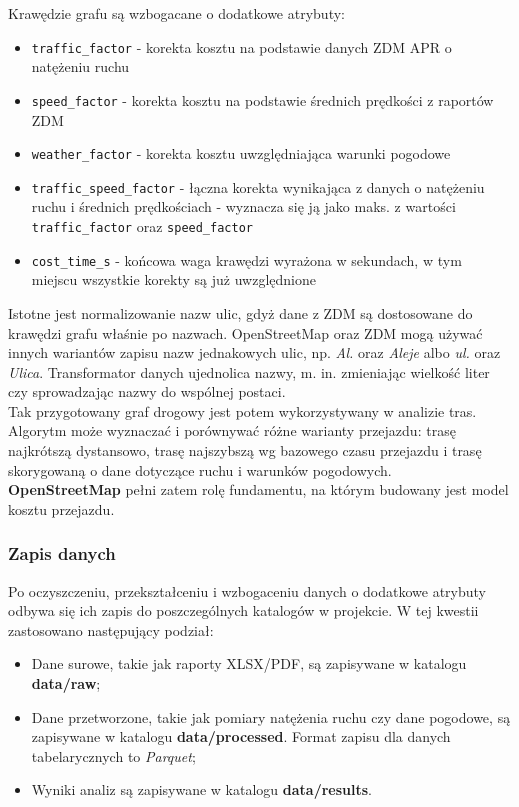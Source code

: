 \documentclass[12pt]{article}
\begin{document}
Krawędzie grafu są wzbogacane o dodatkowe atrybuty:
\begin{itemize}
\item \texttt{traffic\_factor} - korekta kosztu na podstawie danych ZDM APR o natężeniu ruchu
\item \texttt{speed\_factor} - korekta kosztu na podstawie średnich prędkości z raportów ZDM
\item \texttt{weather\_factor} - korekta kosztu uwzględniająca warunki pogodowe
\item \texttt{traffic\_speed\_factor} - łączna korekta wynikająca z danych o natężeniu ruchu i średnich prędkościach - wyznacza się ją jako maks. z wartości \texttt{traffic\_factor} oraz \texttt{speed\_factor}
\item \texttt{cost\_time\_s} - końcowa waga krawędzi wyrażona w sekundach, w tym miejscu wszystkie korekty są już uwzględnione
\end{itemize}

Istotne jest normalizowanie nazw ulic, gdyż dane z ZDM są dostosowane do krawędzi grafu właśnie po nazwach. OpenStreetMap oraz ZDM mogą używać innych wariantów zapisu nazw jednakowych ulic, np. \textit{Al.} oraz \textit{Aleje} albo \textit{ul.} oraz \textit{Ulica}. Transformator danych ujednolica nazwy, m. in. zmieniając wielkość liter czy sprowadzając nazwy do wspólnej postaci.\\

Tak przygotowany graf drogowy jest potem wykorzystywany w analizie tras. Algorytm może wyznaczać i porównywać różne warianty przejazdu: trasę najkrótszą dystansowo, trasę najszybszą wg bazowego czasu przejazdu i trasę skorygowaną o dane dotyczące ruchu i warunków pogodowych.\\

\textbf{OpenStreetMap} pełni zatem rolę fundamentu, na którym budowany jest model kosztu przejazdu.

\subsubsection{Zapis danych}

Po oczyszczeniu, przekształceniu i wzbogaceniu danych o dodatkowe atrybuty odbywa się ich zapis do poszczególnych katalogów w projekcie.
W tej kwestii zastosowano następujący podział:
\begin{itemize}
    \item Dane surowe, takie jak raporty XLSX/PDF, są zapisywane w katalogu \textbf{data/raw};
    \item Dane przetworzone, takie jak pomiary natężenia ruchu czy dane pogodowe, są zapisywane w katalogu \textbf{data/processed}. Format zapisu dla danych tabelarycznych to \emph{Parquet};
    \item Wyniki analiz są zapisywane w katalogu \textbf{data/results}. 
\end{itemize}
\end{document}
